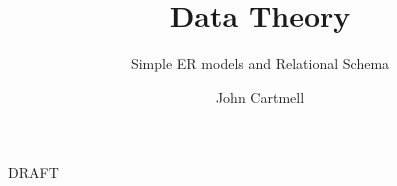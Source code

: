 \documentclass[10pt,a4paper]{scrartcl}
\begin{document}
\title{Data Theory}
\subtitle{Simple ER models and Relational Schema}
\author{John Cartmell}
\maketitle
\begin{center}
DRAFT
\end{center}




%






%
 
%
	 
\end{document}
